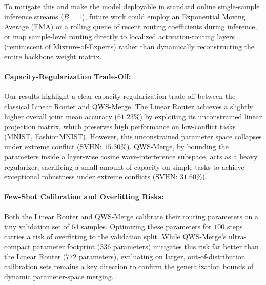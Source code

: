 To mitigate this and make the model deployable in standard online single-sample inference streams ($B=1$), future work could employ an Exponential Moving Average (EMA) or a rolling queue of recent routing coefficients during inference, or map sample-level routing directly to localized activation-routing layers (reminiscent of Mixture-of-Experts) rather than dynamically reconstructing the entire backbone weight matrix.

\paragraph{Capacity-Regularization Trade-Off:}
Our results highlight a clear capacity-regularization trade-off between the classical Linear Router and QWS-Merge. The Linear Router achieves a slightly higher overall joint mean accuracy ($61.23\%$) by exploiting its unconstrained linear projection matrix, which preserves high performance on low-conflict tasks (MNIST, FashionMNIST). However, this unconstrained parameter space collapses under extreme conflict (SVHN: $15.30\%$). QWS-Merge, by bounding the parameters inside a layer-wise cosine wave-interference subspace, acts as a heavy regularizer, sacrificing a small amount of capacity on simple tasks to achieve exceptional robustness under extreme conflicts (SVHN: $31.60\%$).

\paragraph{Few-Shot Calibration and Overfitting Risks:}
Both the Linear Router and QWS-Merge calibrate their routing parameters on a tiny validation set of $64$ samples. Optimizing these parameters for $100$ steps carries a risk of overfitting to the validation split. While QWS-Merge's ultra-compact parameter footprint ($336$ parameters) mitigates this risk far better than the Linear Router ($772$ parameters), evaluating on larger, out-of-distribution calibration sets remains a key direction to confirm the generalization bounds of dynamic parameter-space merging.
